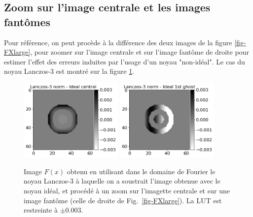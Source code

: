 \documentclass[11pt,twoside]{article}
\begin{document}
\subsection{Zoom sur l'image centrale et les images fantômes}
%
Pour référence, on peut procède à la différence des deux images de la figure \ref{fig-FXlarge}, pour zoomer sur l'image centrale et sur l'image fantôme de droite pour estimer l'effet des erreurs induites par l'usage d'un noyau "non-idéal". Le cas du noyau Lanczos-3 est montré sur la figure \ref{fig-FXimagette-Lanczos3}.
\begin{figure}
\centering
\includegraphics[width=0.45\textwidth]{fig21a.png}
\includegraphics[width=0.45\textwidth]{fig21b.png}
\caption{Image $F(x)$ obtenu en utilisant dans le domaine de Fourier le noyau Lanczos-3 à laquelle on a soustrait l'image obtenue avec le noyau idéal, et procédé à un zoom  sur l'imagette centrale et sur une image fantôme (celle de droite de Fig.~\ref{fig-FXlarge}). La LUT est restreinte à $\pm 0.003$.}
\label{fig-FXimagette-Lanczos3}
\end{figure}
\end{document}
